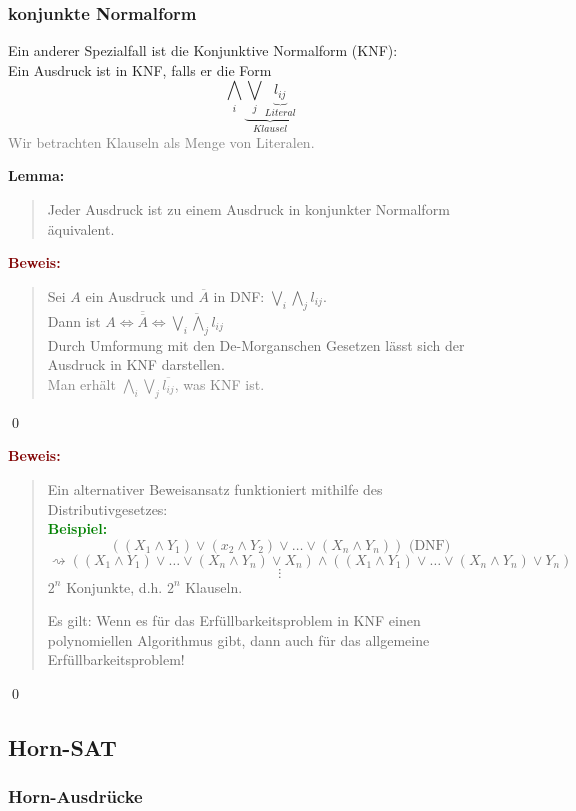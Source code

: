 \documentclass{article}
\newcommand{\gray}[1]{\textcolor{gray}{#1}}
\newcommand{\green}[1]{\textcolor{green}{#1}}
\newcommand{\dgr}[1]{\textcolor{dgr}{#1}}
\newcommand{\maroon}[1]{\textcolor{maroon}{#1}}
\newcommand{\ex}{\green{\textbf{Beispiel: }}}
\newcommand{\lem}[1]{\dgr{\textbf{Lemma: }}\begin{quote}#1\end{quote}}
\newcommand{\pr}[1]{\maroon{\textbf{Beweis: }}\begin{quote}#1\end{quote}\qed}
\newcommand{\n}[1]{\overline{#1}}
\begin{document}
\subsubsection{konjunkte Normalform}

Ein anderer Spezialfall ist die Konjunktive Normalform (KNF):\\
Ein Ausdruck ist in KNF, falls er die Form
\[
    \bigwedge_i \underbrace{\bigvee_j \underbrace{l_{ij}}_{Literal}}_{Klausel}
\]
\gray{Wir betrachten Klauseln als Menge von Literalen.}

\lem{Jeder Ausdruck ist zu einem Ausdruck in konjunkter Normalform äquivalent.}
\pr{
    Sei $A$ ein Ausdruck und \(\n{A}\) in DNF: \(\bigvee_i \bigwedge_j l_{ij}\).\\
    Dann ist \(A \iff \n{\n{A}} \iff \n{\bigvee_i \bigwedge_j l_{ij}}\)\\
    Durch Umformung mit den De-Morganschen Gesetzen lässt sich der Ausdruck in KNF darstellen.\\
    \gray{Man erhält \(\bigwedge_i \bigvee_j \n{l_{ij}}\), was KNF ist.}
}

\newpage
\pr{
    Ein alternativer Beweisansatz funktioniert mithilfe des\\ Distributivgesetzes:\\
    \ex
    \[
        ((X_1 \land Y_1) \lor (x_2 \land Y_2) \lor \dots \lor (X_n \land Y_n)) \text{ (DNF)}
    \]
    \[
        \rightsquigarrow ((X_1 \land Y_1) \lor \dots \lor (X_n \land Y_n) \lor X_n) \land ((X_1 \land Y_1) \lor \dots \lor (X_n \land Y_n) \lor Y_n)    
    \]
    \[\vdots\]
    \(2^n\) Konjunkte, d.h. \(2^n\) Klauseln.
    
    Es gilt: Wenn es für das Erfüllbarkeitsproblem in KNF einen\\
    polynomiellen Algorithmus gibt, dann auch für das allgemeine\\
    Erfüllbarkeitsproblem!
}

\subsection{Horn-SAT}

\subsubsection{Horn-Ausdrücke}
\end{document}
